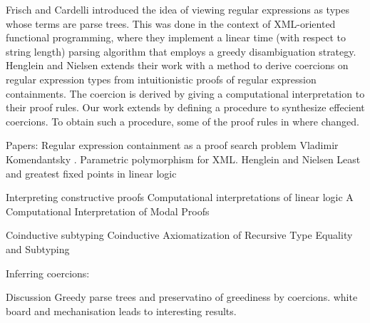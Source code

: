 Frisch and Cardelli \cite{FC04} introduced the idea of viewing regular expressions as types whose terms are parse trees. This was done in the context of XML-oriented functional programming, where they implement a linear time (with respect to string length) parsing algorithm that employs a greedy disambiguation strategy. Henglein and Nielsen \cite{HN11} extends their work with a method to derive coercions on regular expression types from intuitionistic proofs of regular expression containments. The coercion is derived by giving a computational interpretation to their proof rules. Our work extends \cite{HN11} by defining a procedure to synthesize effecient coercions. To obtain such a procedure, some of the proof rules in \cite{HN11} where changed. 


Papers:
Regular expression containment as a proof search problem Vladimir Komendantsky \cite{K11}.
Parametric polymorphism for XML.
Henglein and Nielsen
Least and greatest fixed points in linear logic

Interpreting constructive proofs
Computational interpretations of linear logic \cite{A93}
A Computational Interpretation of Modal Proofs

Coinductive subtyping
Coinductive Axiomatization of Recursive Type Equality and Subtyping

Inferring coercions:

Discussion
Greedy parse trees and preservatino of greediness by coercions. 
white board and mechanisation leads to interesting results.



  
